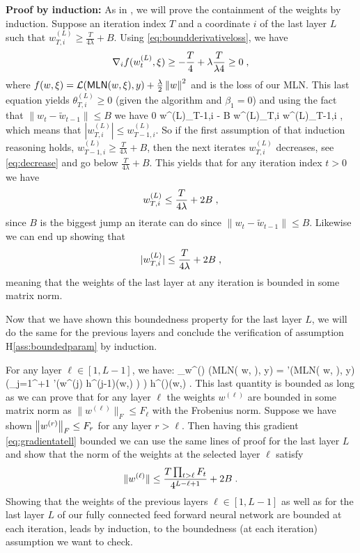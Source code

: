\documentclass[twoside]{article}
\makeatletter
\renewenvironment{proof}[1][\proofname]{%
   \par\pushQED{\qed}\normalfont%
   \topsep6\p@\@plus6\p@\relax
   \trivlist\item[\hskip\labelsep\bfseries#1]%
   \ignorespaces
}{%
   \popQED\endtrivlist\@endpefalse
}
\makeatother
\begin{document}
\begin{proof}
\textbf{Proof by induction:} As in \citep{defossez2020convergence}, we will prove the containment of the weights by induction.
Suppose an iteration index $T$ and a coordinate $i$ of the last layer $L$ such that $w^{(L)}_{T, i} \geq \frac{T}{4\lambda} + B$.
Using \eqref{eq:boundderivativeloss}, we have
$$
\nabla_i f(w^{(L)}_t, \xi) \geq - \frac{T}{4} + \lambda \frac{T}{\lambda4} \geq 0 \;,
$$
where $f(w, \xi) = \mathcal{L}(\textsf{MLN}( w, \xi), y) +\frac{\lambda}{2}\left\Vert w \right\Vert^2$ and is the loss of our MLN.
This last equation yields $\theta^{(L)}_{T,i} \geq 0$ (given the algorithm and $\beta_1 = 0$) and using the fact that $\|w_t - \tilde{w}_{t-1}\| \leq B$ we have
\beq\label{eq:decrease}
0 \leq w^{(L)}_{T-1,i} - B \leq w^{(L)}_{T,i} \leq w^{(L)}_{T-1,i} \eqsp,
\eeq
which means that $| w^{(L)}_{T,i}| \leq w^{(L)}_{T-1,i}$.
So if the first assumption of that induction reasoning holds, \ie $w^{(L)}_{T-1, i} \geq \frac{T}{4\lambda} + B$, then the next iterates $w^{(L)}_{T, i}$ decreases, see \eqref{eq:decrease} and go below $\frac{T}{4\lambda} + B$. This yields that for any iteration index $t >0$ we have 
$$
w^{(L)}_{T, i} \leq \frac{T}{4\lambda} + 2B \;,
$$
since $B$ is the biggest jump an iterate can do since $\|w_t - \tilde{w}_{t-1}\| \leq B$.
Likewise we can end up showing that 
$$
|w^{(L)}_{T, i}| \leq \frac{T}{4\lambda} + 2B \;,
$$
meaning that the weights of the last layer at any iteration is bounded in some matrix norm.

Now that we have shown this boundedness property for the last layer $L$, we will do the same for the previous layers and conclude the verification of assumption H\ref{ass:boundedparam} by induction.

For any layer $\ell \in [1, L-1]$, we have:
\beq\label{eq:gradientatell}
\nabla_{w^{(\ell)}}  (\textsf{MLN}( w, \xi), y)  =  '(\textsf{MLN}( w, \xi), y) \left(\prod_{j=1}^{\ell+1} \sigma'\left(w^{(j)} h^{(j-1)}(w,\xi) \right) \right) h^{()}(w,\xi)  \eqsp.
\eeq
This last quantity is bounded as long as we can prove that for any layer $\ell$ the weights $w^{(\ell)}$ are bounded in some matrix norm as $\|w^{(\ell)}\|_{F} \leq F_\ell$ with the Frobenius norm.
Suppose we have shown $\left\Vert w^{(r)} \right\Vert_{F} \leq F_r$ for any layer $r > \ell$. 
Then having this gradient \eqref{eq:gradientatell} bounded we can use the same lines of proof for the last layer $L$ and show that the norm of the weights at the selected layer $\ell$ satisfy
$$
\|w^{(\ell)}\| \leq \frac{T \prod_{t > \ell} F_t}{4^{L-\ell+1}} + 2B\;.
$$
Showing that the weights of the previous layers $\ell \in [1, L-1]$ as well as for the last layer $L$ of our fully connected feed forward neural network are bounded at each iteration, leads by induction, to the boundedness (at each iteration) assumption we want to check.
\end{proof}
\end{document}
